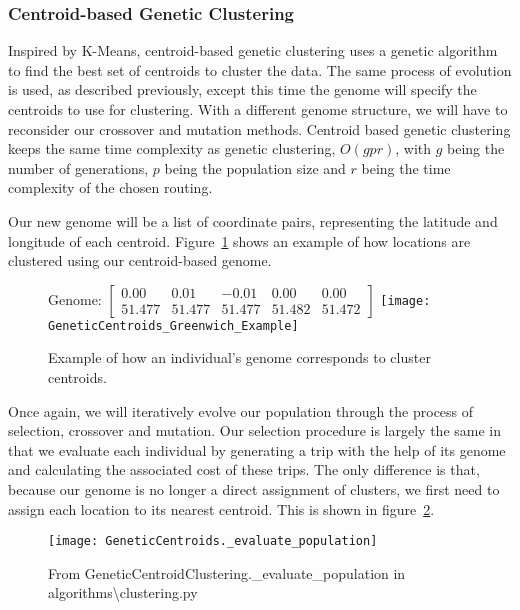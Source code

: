 
\subsubsection{Centroid-based Genetic Clustering}
Inspired by K-Means, centroid-based genetic clustering uses a genetic algorithm to find the best set of centroids
to cluster the data.
The same process of evolution is used, as described previously, except this time the genome will specify the
centroids to use for clustering.
With a different genome structure, we will have to reconsider our crossover and mutation methods.
Centroid based genetic clustering keeps the same time complexity as genetic clustering, $O(g p r)$, with $g$ being the
number of generations, $p$ being the population size and $r$ being the time complexity of the chosen routing.\\

\noindent
Our new genome will be a list of coordinate pairs, representing the latitude and longitude of each centroid.
Figure~\ref{fig:GeneticCentroids_Greenwich_Example} shows an example of how locations are clustered using our centroid-based genome.
\begin{figure}[H]
    \centering
    Genome: $\begin{bmatrix}0.00 & 0.01 & -0.01 & 0.00 & 0.00\\51.477 & 51.477 & 51.477 & 51.482 & 51.472\end{bmatrix}$
    \texttt{[image: GeneticCentroids\_Greenwich\_Example]}
    \caption{Example of how an individual's genome corresponds to cluster centroids.}
    \label{fig:GeneticCentroids_Greenwich_Example}
\end{figure}

\noindent
Once again, we will iteratively evolve our population through the process of selection, crossover and mutation.
Our selection procedure is largely the same in that we evaluate each individual by generating a trip with the help
of its genome and calculating the associated cost of these trips.
The only difference is that, because our genome is no longer a direct assignment of clusters, we first need to
assign each location to its nearest centroid.
This is shown in figure~\ref{fig:GeneticCentroids._evaluate_population}.
\begin{figure}[H]
    \centering
    \texttt{[image: GeneticCentroids.\_evaluate\_population]}
    \caption{From GeneticCentroidClustering.\_evaluate\_population in algorithms\textbackslash clustering.py}
    \label{fig:GeneticCentroids._evaluate_population}
\end{figure}

